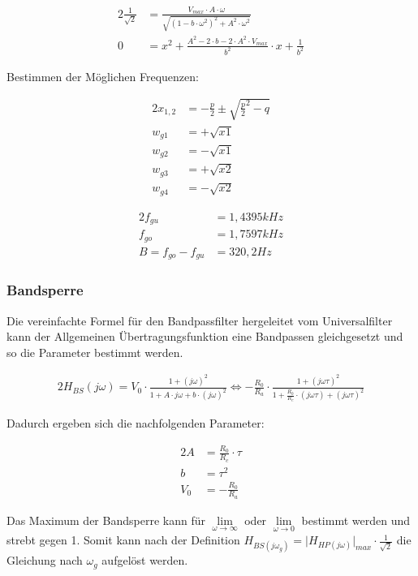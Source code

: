 \begin{alignat}{2}
\frac{1}{\sqrt{2}} &= \frac{V_{max} \cdot A \cdot \omega}{\sqrt{\left(1- b\cdot \omega^2 \right)^2 + A^2 \cdot \omega^2}}\\
0 &= x^2 + \frac{A^2 - 2 \cdot b - 2 \cdot A^2 \cdot V_{max}}{b^2} \cdot x + \frac{1}{b^2}
\end{alignat}

\noindent Bestimmen der Möglichen Frequenzen:

\begin{alignat}{2}
x_{1,2} &= -\frac{p}{2} \pm \sqrt{\frac{p}{2}^2 - q}\\
w_{g1} &= +\sqrt{x1}\\
w_{g2} &= -\sqrt{x1}\\
w_{g3} &= +\sqrt{x2}\\
w_{g4} &= -\sqrt{x2}
\end{alignat}

\begin{alignat}{2}
f_{gu} &= 1,4395 kHz\\
f_{go} &= 1,7597 kHz\\
B = f_{go} - f_{gu} &= 320,2 Hz
\end{alignat}

\newpage

\subsubsection{Bandsperre}

Die vereinfachte Formel für den Bandpassfilter hergeleitet vom Universalfilter kann der Allgemeinen Übertragungsfunktion eine Bandpassen gleichgesetzt und so die Parameter bestimmt werden.

\begin{alignat}{2}
H_{BS}(j\omega) = V_{0} \cdot \frac{1 + (j\omega)^2}{1 + A \cdot j \omega + b \cdot (j\omega)^2} \Longleftrightarrow - \frac{R_{0}}{R_{a}} \cdot \frac{1 + (j\omega \tau)^2}{1 + \frac{R_{0}}{R_{c}} \cdot (j\omega \tau) + (j\omega \tau)^2}
\end{alignat}

\noindent Dadurch ergeben sich die nachfolgenden Parameter:

\begin{alignat}{2}
A &= \frac{R_{0}}{R_{c}} \cdot \tau\\
b &= \tau^2\\
V_{0} &= - \frac{R_{0}}{R_{a}}
\end{alignat}

\noindent Das Maximum der Bandsperre kann für $\lim\limits_{\omega \to \infty}$ oder $\lim\limits_{\omega \to 0}$ bestimmt werden und strebt gegen 1. Somit kann nach der Definition $H_{BS (j \omega_{g})} = \lvert H_{HP (j \omega)} \rvert_{max} \cdot \frac{1}{\sqrt{2}}$  die Gleichung nach $\omega_{g}$ aufgelöst werden.

